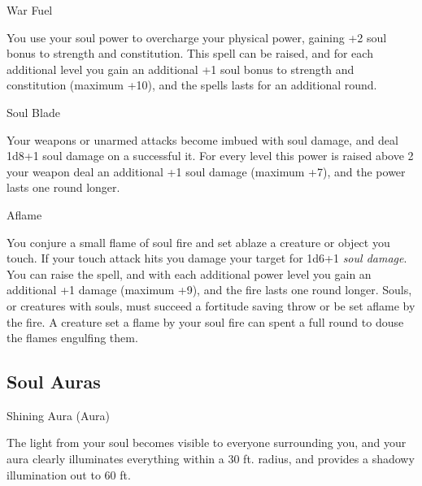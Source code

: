 \begin{soulpower}{War Fuel}
  \rangepersonal

  You use your soul power to overcharge your physical power, gaining +2 soul
  bonus to strength and constitution. This spell can be raised, and for each
  additional level you gain an additional +1 soul bonus to strength and
  constitution (maximum +10), and the spells lasts for an additional round.
\end{soulpower}

\begin{soulpower}{Soul Blade}

  Your weapons or unarmed attacks become imbued with soul damage, and deal
  1d8+1 soul damage on a successful it. For every level this power is raised
  above 2 your weapon deal an additional +1 soul damage (maximum +7), and the
  power lasts one round longer.
\end{soulpower}

\begin{soulpower}{Aflame}

  You conjure a small flame of soul fire and set ablaze a creature or object
  you touch. If your touch attack hits you damage your target for 1d6+1
  \emph{soul damage}. You can raise the spell, and with each additional power
  level you gain an additional +1 damage (maximum +9), and the fire lasts one
  round longer.  Souls, or creatures with souls, must succeed a fortitude
  saving throw or be set aflame by the fire. A creature set a flame by your
  soul fire can spent a full round to douse the flames engulfing them.
\end{soulpower}

\subsection{Soul Auras}

\begin{soulpower}{Shining Aura (Aura)}
  \components{-}
  \rangepersonal

  The light from your soul becomes visible to everyone surrounding you, and
  your aura clearly illuminates everything within a 30 ft. radius, and
  provides a shadowy illumination out to 60 ft.
\end{soulpower}

